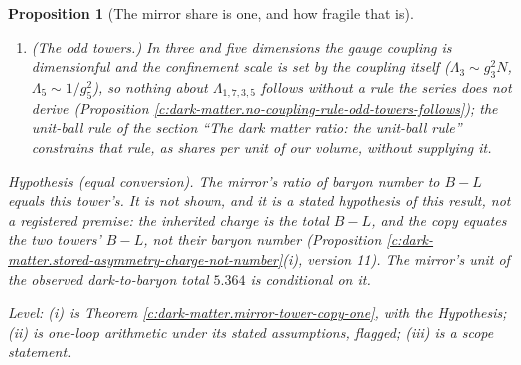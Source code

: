 \documentclass[11pt]{article}
\newtheorem{proposition}[theorem]{Proposition}
\theoremstyle{definition}
\theoremstyle{plain}
\begin{document}
\begin{proposition}[The mirror share is one, and how fragile that is]
\begin{enumerate}
One Dirac flavour is $\Delta b = 2/3$, which with $\Lambda_{6} = 0.3$ GeV moves the mirror share by a factor between $4.89$ (bottom of the ceiling range, $b_{6} = 11$) and $21.4$ (top, $b_{6} = 7$), past the observed $5.364$ everywhere except at the bottom of the range on the most conservative branch. A coupling departure $\delta = \alpha_{2}(M)^{-1} - \alpha_{6}(M)^{-1}$ at the ceiling with identical content moves $\Lambda_{2}/\Lambda_{6}$ by $e^{-2\pi\delta/b}$, a factor $2.45$ per unit at $b = 7$, so the share stays within ten percent of one only for $|\delta| < 0.106$. So the mass factor of $f_{2}$ is exactly one, protected by the common-ceiling-coupling premise (Premise \ref{c:synthesis.common-ceiling-coupling-premise}), and fragile; $f_{2} = 1$ itself holds under Hypothesis (equal conversion) in addition.
\item[(iii)] \emph{(The odd towers.)} In three and five dimensions the gauge coupling is dimensionful and the confinement scale is set by the coupling itself ($\Lambda_{3} \sim g_{3}^{2}N$, $\Lambda_{5} \sim 1/g_{5}^{2}$), so nothing about $\Lambda_{1,7,3,5}$ follows without a rule the series does not derive (Proposition \ref{c:dark-matter.no-coupling-rule-odd-towers-follows}); the unit-ball rule of the section ``The dark matter ratio: the unit-ball rule'' constrains that rule, as shares per unit of our volume, without supplying it.
\end{enumerate}
\emph{Hypothesis (equal conversion).} The mirror's ratio of baryon number to $B - L$ equals this tower's. It is not shown, and it is a stated hypothesis of this result, not a registered premise: the inherited charge is the total $B - L$, and the copy equates the two towers' $B - L$, not their baryon number (Proposition \ref{c:dark-matter.stored-asymmetry-charge-not-number}(i), version 11). The mirror's unit of the observed dark-to-baryon total $5.364$ is conditional on it.

Level: (i) is Theorem \ref{c:dark-matter.mirror-tower-copy-one}, with the Hypothesis; (ii) is one-loop arithmetic under its stated assumptions, flagged; (iii) is a scope statement.
\end{proposition}
\end{document}
